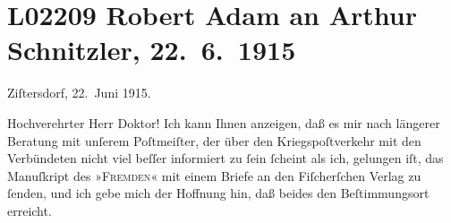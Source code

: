 

\section[Robert Adam an Arthur Schnitzler, 22. 6. 1915]{L02209 Robert Adam an Arthur Schnitzler, 22. 6. 1915}
\nopagebreak{}
\rehead{ }\normalsize\beginnumbering{}
\toendnotes[C]{\smallbreak\pagebreak[2]}
\toendnotes[C]{\smallbreak}
\pstart
           \raggedleft{}{\pb}Ziſtersdorf, 22. Juni 1915. \pend
           
\pstart{}Hochverehrter Herr Doktor!\pend\vspace{0.5em}
\pstart
           Ich kann Ihnen anzeigen, daß es mir nach längerer Beratung mit unſerem Poſtmeiſter, der über den
               Kriegspoſtverkehr mit den Verbündeten nicht viel beſſer informiert zu ſein ſcheint
               als ich, gelungen iſt, das Manuſkript des »\textsc{Fremden}« mit einem Briefe an den Fiſcherſchen
                  Verlag zu ſenden, und ich gebe mich der Hoffnung hin, daß beides den
               Beſtimmungsort erreicht.\pend
           
